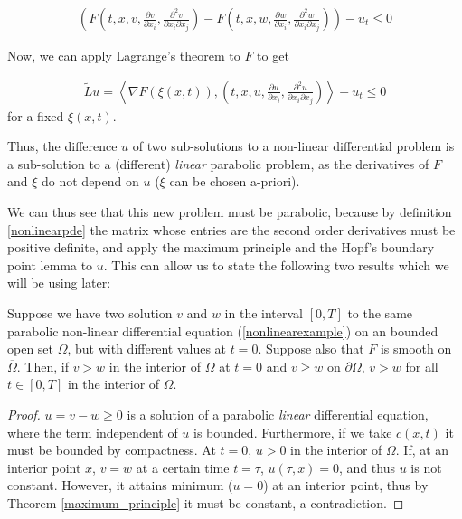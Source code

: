 \begin{align*}
	\left( F\left(t, x, v, \frac{\partial v}{\partial x_i} , \frac{\partial^2 v}{\partial x_i \partial x_j}\right) - F\left(t, x, w, \frac{\partial w}{\partial x_i} , \frac{\partial^2 w}{\partial x_i \partial x_j}\right)\right)-u_t \leq 0
\end{align*}

Now, we can apply Lagrange's theorem to $F$ to get 

\begin{align*}
	\tilde{L}u= \left\langle \nabla F(\xi(x, t)), \left(t, x, u, \frac{\partial u}{\partial x_i} , \frac{\partial^2 u}{\partial x_i \partial x_j}\right) \right\rangle-u_t \leq 0
\end{align*}
for a fixed $\xi(x, t)$.


Thus, the difference $u$ of two sub-solutions to a non-linear differential problem is a sub-solution to a (different) \textit{linear} parabolic problem, as the derivatives of $F$ and $\xi$ do not depend on $u$ ($\xi$ can be chosen a-priori).

We can thus see that this new problem must be parabolic, because by definition \ref{nonlinearpde} the matrix whose entries are the second order derivatives must be positive definite, and apply the maximum principle and the Hopf's boundary point lemma to $u$. This can allow us to state the following two results which we will be using later:

\begin{proposition}
	\label{firstapplication}
	Suppose we have two solution $v$ and $w$ in the interval $[0, T]$ to the same parabolic non-linear differential equation (\ref{nonlinearexample}) on an bounded open set $\Omega$, but with different values at $t=0$. Suppose also that $F$ is smooth on  $\overline{\Omega}$. Then, if $v>w$ in the interior of $\Omega$ at $t=0$ and $v\geq w$ on $\partial\Omega$,  $v>w$ for all $t\in[0, T]$ in the interior of $\Omega$.
\end{proposition}

\begin{proof}
	$u=v-w\geq 0$ is a solution of a parabolic \textit{linear} differential equation, where the term independent of $u$ is bounded. Furthermore, if we take $c(x, t)$ it must be bounded by compactness. At $t=0$, $u>0$ in the interior of $\Omega$. If, at an interior point $x$, $v=w$ at a certain time $t=\tau$, $u(\tau, x)=0$, and thus $u$ is not constant. However, it attains minimum ($u=0$) at an interior point, thus by Theorem \ref{maximum_principle} it must be constant, a contradiction. 
\end{proof}

